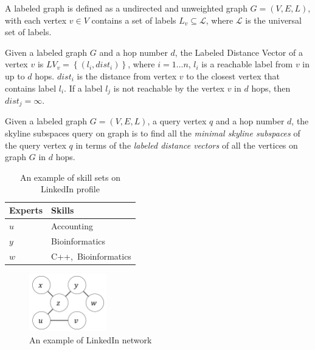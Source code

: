 \begin{definition}
A labeled graph is defined as a undirected and unweighted graph $G = (V, E, L)$, with each vertex $v \in V$ contains a set of labels $L_v \subseteq \mathcal{L}$, where $\mathcal{L}$ is the universal set of labels.
\end{definition}

\begin{definition}
Given a labeled graph $G$ and a hop number $d$, the Labeled Distance Vector of a vertex $v$ is $LV_v=\left\{\left(l_i, dist_i\right)\right\}$, where $i = 1 \ldots n$, $l_i$ is a reachable label from $v$ in up to $d$ hops. $dist_i$ is the distance from vertex $v$ to the closest vertex that contains label $l_i$. If a label $l_j$ is not reachable by the vertex $v$ in $d$ hops, then $dist_j = \infty$.
\end{definition}

\begin{definition}
Given a labeled graph $G = (V, E, L)$, a query vertex $q$ and a hop number $d$, the skyline subspaces query on graph is to find all the \emph{minimal skyline subspaces} of the query vertex $q$ in terms of the \emph{labeled distance vectors} of all the vertices on graph $G$ in $d$ hops.
\end{definition}

\begin{table}[h]
    \centering
    \begin{tabular}{|l|l|}
    \hline
    Experts     & Skills \\ \hline
    $u$         & Accounting     \\ \hline
    $y$         & Bioinformatics  \\ \hline
    $w$         & C++,~Bioinformatics \\ \hline
    \end{tabular}
    \caption{\label{tab:skill_sets}An example of skill sets on LinkedIn profile}
\end{table}
    
\begin{figure}[h]
    \centering
    \includegraphics[width=0.3\textwidth]{figs/graph_example}
    \caption{An example of LinkedIn network}
    \label{fig:graph}
\end{figure}

